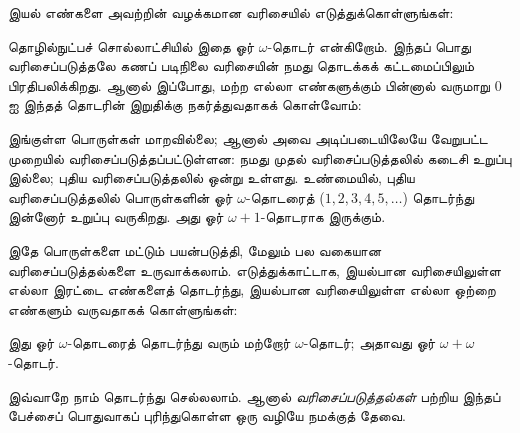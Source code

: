 \documentclass[../../../include/open-logic-section]{subfiles}
\begin{document}

இயல் எண்களை அவற்றின் வழக்கமான வரிசையில் எடுத்துக்கொள்ளுங்கள்:
\begin{center}
\end{center}
தொழில்நுட்பச் சொல்லாட்சியில் இதை ஓர் $\omega$-தொடர் என்கிறோம். இந்தப்
பொது வரிசைப்படுத்தலே கணப் படிநிலை வரிசையின் நமது தொடக்கக் கட்டமைப்பிலும்
பிரதிபலிக்கிறது. ஆனால் இப்போது, மற்ற எல்லா எண்களுக்கும் பின்னால் வருமாறு
$0$ ஐ இந்தத் தொடரின் இறுதிக்கு நகர்த்துவதாகக் கொள்வோம்:
\begin{center}
\end{center}
இங்குள்ள பொருள்கள் மாறவில்லை; ஆனால் அவை அடிப்படையிலேயே வேறுபட்ட முறையில்
வரிசைப்படுத்தப்பட்டுள்ளன: நமது முதல் வரிசைப்படுத்தலில் கடைசி உறுப்பு
இல்லை; புதிய வரிசைப்படுத்தலில் ஒன்று உள்ளது. உண்மையில், புதிய
வரிசைப்படுத்தலில் பொருள்களின் ஓர் $\omega$-தொடரைத் ($1, 2, 3, 4, 5,
\ldots$) தொடர்ந்து இன்னோர் உறுப்பு வருகிறது. அது ஓர்
$\omega+1$-தொடராக இருக்கும்.

இதே பொருள்களை மட்டும் பயன்படுத்தி, மேலும் பல வகையான வரிசைப்படுத்தல்களை
உருவாக்கலாம். எடுத்துக்காட்டாக, இயல்பான வரிசையிலுள்ள எல்லா இரட்டை
எண்களைத் தொடர்ந்து, இயல்பான வரிசையிலுள்ள எல்லா ஒற்றை எண்களும் வருவதாகக்
கொள்ளுங்கள்:
\begin{center}
\end{center}
இது ஓர் $\omega$-தொடரைத் தொடர்ந்து வரும் மற்றோர் $\omega$-தொடர்;
அதாவது ஓர் $\omega+\omega$-தொடர்.

இவ்வாறே நாம் தொடர்ந்து செல்லலாம். ஆனால் \emph{வரிசைப்படுத்தல்கள்} பற்றிய
இந்தப் பேச்சைப் பொதுவாகப் புரிந்துகொள்ள ஒரு வழியே நமக்குத் தேவை.
\end{document}
